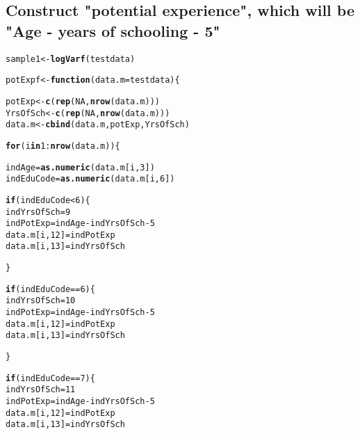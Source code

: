 \documentclass{article}\usepackage[]{graphicx}\usepackage[]{color}
\makeatletter
\newcommand{\hlnum}[1]{\textcolor[rgb]{0.686,0.059,0.569}{#1}}%
\newcommand{\hlopt}[1]{\textcolor[rgb]{0,0,0}{#1}}%
\newcommand{\hlstd}[1]{\textcolor[rgb]{0.345,0.345,0.345}{#1}}%
\newcommand{\hlkwa}[1]{\textcolor[rgb]{0.161,0.373,0.58}{\textbf{#1}}}%
\newcommand{\hlkwb}[1]{\textcolor[rgb]{0.69,0.353,0.396}{#1}}%
\newcommand{\hlkwc}[1]{\textcolor[rgb]{0.333,0.667,0.333}{#1}}%
\newcommand{\hlkwd}[1]{\textcolor[rgb]{0.737,0.353,0.396}{\textbf{#1}}}%
\newenvironment{kframe}{%
 \def\at@end@of@kframe{}%
 \ifinner\ifhmode%
  \def\at@end@of@kframe{\end{minipage}}%
  \begin{minipage}{\columnwidth}%
 \fi\fi%
 \def\FrameCommand##1{\hskip\@totalleftmargin \hskip-\fboxsep
 \colorbox{shadecolor}{##1}\hskip-\fboxsep
     \hskip-\linewidth \hskip-\@totalleftmargin \hskip\columnwidth}%
 \MakeFramed {\advance\hsize-\width
   \@totalleftmargin\z@ \linewidth\hsize
   \@setminipage}}%
 {\par\unskip\endMakeFramed%
 \at@end@of@kframe}
\newenvironment{knitrout}{}{} %
\makeatother
\begin{document}
\subsection{Construct "potential experience", which will be "Age - years of schooling - 5"}

\begin{knitrout}\scriptsize
{}\color{fgcolor}\begin{kframe}
\begin{alltt}
\hlstd{sample1} \hlkwb{<-} \hlkwd{logVarf}\hlstd{(testdata)}

\hlstd{potExpf} \hlkwb{<-} \hlkwa{function}\hlstd{(}\hlkwc{data.m} \hlstd{= testdata)\{}

  \hlstd{potExp} \hlkwb{<-} \hlkwd{c}\hlstd{(}\hlkwd{rep}\hlstd{(}\hlnum{NA}\hlstd{,} \hlkwd{nrow}\hlstd{(data.m)))}
  \hlstd{YrsOfSch} \hlkwb{<-} \hlkwd{c}\hlstd{(}\hlkwd{rep}\hlstd{(}\hlnum{NA}\hlstd{,} \hlkwd{nrow}\hlstd{(data.m)))}
  \hlstd{data.m} \hlkwb{<-} \hlkwd{cbind}\hlstd{(data.m, potExp, YrsOfSch)}

  \hlkwa{for} \hlstd{(i} \hlkwa{in} \hlnum{1}\hlopt{:}\hlkwd{nrow}\hlstd{(data.m))\{}

    \hlstd{indAge} \hlkwb{=} \hlkwd{as.numeric}\hlstd{(data.m[i,}\hlnum{3}\hlstd{])}
    \hlstd{indEduCode} \hlkwb{=} \hlkwd{as.numeric}\hlstd{(data.m[i,}\hlnum{6}\hlstd{])}

    \hlkwa{if} \hlstd{(indEduCode} \hlopt{<} \hlnum{6}\hlstd{)\{}
      \hlstd{indYrsOfSch} \hlkwb{=} \hlnum{9}
      \hlstd{indPotExp} \hlkwb{=} \hlstd{indAge} \hlopt{-} \hlstd{indYrsOfSch} \hlopt{-} \hlnum{5}
      \hlstd{data.m[i,}\hlnum{12}\hlstd{]} \hlkwb{=} \hlstd{indPotExp}
      \hlstd{data.m[i,}\hlnum{13}\hlstd{]} \hlkwb{=} \hlstd{indYrsOfSch}

    \hlstd{\}}

    \hlkwa{if} \hlstd{(indEduCode} \hlopt{==} \hlnum{6}\hlstd{)\{}
      \hlstd{indYrsOfSch} \hlkwb{=} \hlnum{10}
      \hlstd{indPotExp} \hlkwb{=} \hlstd{indAge} \hlopt{-} \hlstd{indYrsOfSch} \hlopt{-} \hlnum{5}
      \hlstd{data.m[i,}\hlnum{12}\hlstd{]} \hlkwb{=} \hlstd{indPotExp}
      \hlstd{data.m[i,}\hlnum{13}\hlstd{]} \hlkwb{=} \hlstd{indYrsOfSch}

    \hlstd{\}}

    \hlkwa{if} \hlstd{(indEduCode} \hlopt{==} \hlnum{7}\hlstd{)\{}
      \hlstd{indYrsOfSch} \hlkwb{=} \hlnum{11}
      \hlstd{indPotExp} \hlkwb{=} \hlstd{indAge} \hlopt{-} \hlstd{indYrsOfSch} \hlopt{-} \hlnum{5}
      \hlstd{data.m[i,}\hlnum{12}\hlstd{]} \hlkwb{=} \hlstd{indPotExp}
      \hlstd{data.m[i,}\hlnum{13}\hlstd{]} \hlkwb{=} \hlstd{indYrsOfSch}


\end{alltt}
\end{kframe}
\end{knitrout}
\end{document}

